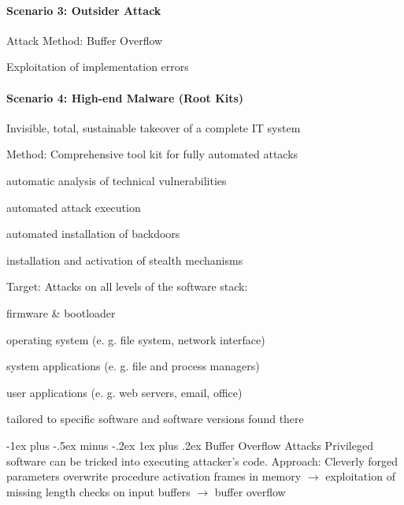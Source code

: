 \documentclass[a4paper]{article}
\makeatletter
\renewcommand{\subsubsection}{\@startsection{subsubsection}{3}{0mm}%
                {-1ex plus -.5ex minus -.2ex}%
                {1ex plus .2ex}%
                {\normalfont\small\bfseries}}
\makeatother
\begin{document}
\begin{multicols}{3}
    \paragraph{Scenario 3: Outsider Attack}
    \begin{itemize*}
        \item Attack Method: Buffer Overflow
        \item Exploitation of implementation errors
    \end{itemize*}

    \paragraph{Scenario 4: High-end Malware (Root Kits)}
    \begin{itemize*}
        \item Invisible, total, sustainable takeover of a complete IT system
        \item Method: Comprehensive tool kit for fully automated attacks
        \begin{enumerate*}
            \item automatic analysis of technical vulnerabilities
            \item automated attack execution
            \item automated installation of backdoors
            \item installation and activation of stealth mechanisms
        \end{enumerate*}
        \item Target: Attacks on all levels of the software stack:
        \begin{itemize*}
            \item firmware \& bootloader
            \item operating system (e. g. file system, network interface)
            \item system applications (e. g. file and process managers)
            \item user applications (e. g. web servers, email, office)
        \end{itemize*}
        \item tailored to specific software and software versions found there
    \end{itemize*}

    \subsubsection{Buffer Overflow Attacks}
    Privileged software can be tricked into executing attacker’s code.
    Approach: Cleverly forged parameters overwrite procedure activation frames in memory $\rightarrow$ exploitation of missing length checks on input buffers $\rightarrow$ buffer overflow


\end{multicols}
\end{document}
